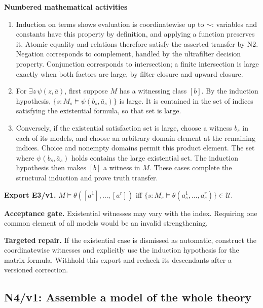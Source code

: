 \documentclass[preprint,12pt,aps,pra,showkeys,amsmath,amssymb,superscriptaddress,floatfix]{revtex4-2}
\theoremstyle{definition}
\theoremstyle{remark}
\newcommand{\field}[2]{\par\smallskip\noindent\textbf{#1.} #2\par}
\begin{document}
\smallskip\noindent\textbf{Numbered mathematical activities}

\begin{enumerate}[label=N3.\arabic*,leftmargin=3.4em]

\item Induction on terms shows evaluation is coordinatewise up to \(\sim\):
variables and constants have this property by definition, and applying a
function preserves it. Atomic equality and relations therefore satisfy
the asserted transfer by N2. Negation corresponds to complement, handled
by the ultrafilter decision property. Conjunction corresponds to
intersection; a finite intersection is large exactly when both factors
are large, by filter closure and upward closure.

\item For \(\exists z\,\psi(z,\bar a)\), first suppose \(M\) has a witnessing
class \([b]\). By the induction hypothesis,
\(\{s:M_s\models\psi(b_s,\bar a_s)\}\) is large. It is contained in the
set of indices satisfying the existential formula, so that set is large.

\item Conversely, if the existential satisfaction set is large, choose a
witness \(b_s\) in each of its models, and choose an arbitrary domain
element at the remaining indices. Choice and nonempty domains permit
this product element. The set where \(\psi(b_s,\bar a_s)\) holds
contains the large existential set. The induction hypothesis then makes
\([b]\) a witness in \(M\). These cases complete the structural
induction and prove truth transfer.

\end{enumerate}

\field{Export E3/v1}{\(M\models\theta([a^1],\ldots,[a^r])\) iff
\(\{s:M_s\models\theta(a_s^1,\ldots,a_s^r)\}\in\mathcal U\).}

\field{Acceptance gate}{Existential witnesses may vary with the index. Requiring one common
element of all models would be an invalid strengthening.}

\field{Targeted repair}{If the existential case is dismissed as automatic, construct the
coordinatewise witnesses and explicitly use the induction hypothesis for
the matrix formula. Withhold this export and recheck its descendants
after a versioned correction.}

\endgroup

\clearpage

\subsection{N4/v1: Assemble a model of the whole theory}
\end{document}
